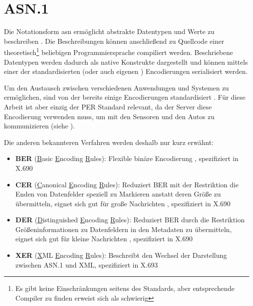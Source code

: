 
\section{ASN.1}

Die Notationsform \gls{asn} ermöglicht abstrakte Datentypen und Werte zu beschreiben \cite{asn:layman}.
Die Beschreibungen können anschließend zu Quellcode einer theoretisch\footnote{Es gibt keine Einschränkungen seitens des Standards, aber entsprechende Compiler zu finden erweist sich als schwierig } beliebigen Programmiersprache compiliert werden.
Beschriebene Datentypen werden dadurch als native Konstrukte dargestellt und können mittels einer der standardisierten (oder auch eigenen \cite{asn:itu:ecn}) Encodierungen serialisiert werden.

Um den Austausch zwischen verschiedenen Anwendungen und Systemen zu ermöglichen, sind von der  bereits einige Encodierungen standardisiert \cite[8]{asn:itu:x691}.
Für diese Arbeit ist aber einzig der PER Standard relevant, da der Server diese Encodierung verwenden muss, um mit den Sensoren und den Autos zu kommunizieren (siehe ).

Die anderen bekannteren Verfahren werden deshalb nur kurz erwähnt:
\begin{itemize}
	\item \textbf{BER} (\underline{B}asic \underline{E}ncoding \underline{R}ules): Flexible binäre Encodierung \cite{asn:wiki:x690}, spezifiziert in X.690 \cite{asn:itu:x690}
	\item \textbf{CER} (\underline{C}anonical \underline{E}ncoding \underline{R}ules): Reduziert BER mit der Restriktion die Enden von Datenfelder speziell zu Markieren anstatt deren Größe zu übermitteln, eignet sich gut für große Nachrichten \cite{asn:wiki:x690}, spezifiziert in X.690 \cite{asn:itu:x690}
	\item \textbf{DER} (\underline{D}istinguished \underline{E}ncoding \underline{R}ules): Reduziert BER durch die Restriktion Größeninformationen zu Datenfeldern in den Metadaten zu übermitteln, eignet sich gut für kleine Nachrichten \cite{asn:wiki:x690}, spezifiziert in X.690 \cite{asn:itu:x690}
	\item \textbf{XER} (\underline{X}ML \underline{E}ncoding \underline{R}ules): Beschreibt den Wechsel der Darstellung zwischen ASN.1 und XML, spezifiziert in X.693 \cite{asn:itu:x693}
\end{itemize}


